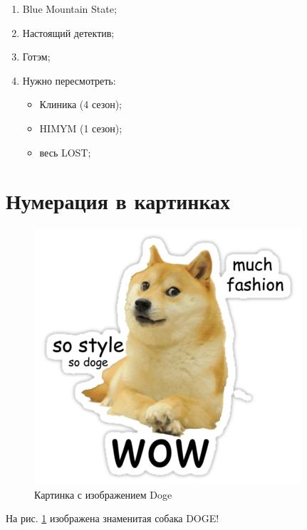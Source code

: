 \documentclass[12pt, a4paper]{article}  %
\begin{document}
\renewcommand{\labelenumi}{   (  \asbuk{enumi}   ]   }
\renewcommand{\labelitemi}{  $\sigma$  }

\begin{enumerate}
	\item  Blue Mountain State;
	\item  Настоящий детектив;
	\item  Готэм;
	\item  Нужно пересмотреть: 
		\begin{itemize}
			\item  Клиника (4 сезон);
			\item  HIMYM (1 сезон);
			\item  весь LOST;
		\end{itemize}	
\end{enumerate}


\section{Нумерация в картинках} 

\begin{figure}[H]
	\begin{center}
		\includegraphics[width=0.2\textheight]{doge.png}
	\end{center}
	\caption{Картинка с изображением Doge}\label{pic:doge}
\end{figure}

На рис. \ref{pic:doge} изображена знаменитая собака DOGE!
\end{document}
